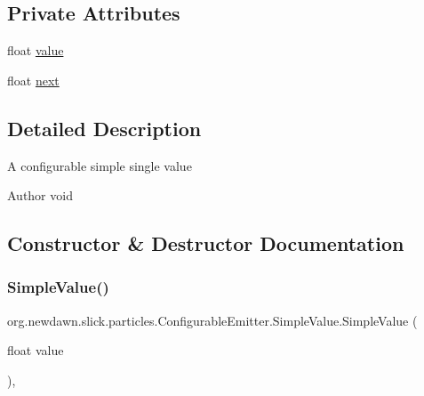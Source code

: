 \subsection*{Private Attributes}
\begin{DoxyCompactItemize}
\item 
float \mbox{\hyperlink{classorg_1_1newdawn_1_1slick_1_1particles_1_1_configurable_emitter_1_1_simple_value_a660ac8ed4db304925cecaf64165c1f3e}{value}}
\item 
float \mbox{\hyperlink{classorg_1_1newdawn_1_1slick_1_1particles_1_1_configurable_emitter_1_1_simple_value_aacb73adb8b1df543d9dbbda8d66db1bf}{next}}
\end{DoxyCompactItemize}


\subsection{Detailed Description}
A configurable simple single value

\begin{DoxyAuthor}{Author}
void 
\end{DoxyAuthor}


\subsection{Constructor \& Destructor Documentation}
\mbox{\label{classorg_1_1newdawn_1_1slick_1_1particles_1_1_configurable_emitter_1_1_simple_value_a9ba58964298d037d732dab840f730013}} 
\subsubsection{\texorpdfstring{Simple\+Value()}{SimpleValue()}}
{\footnotesize\ttfamily org.\+newdawn.\+slick.\+particles.\+Configurable\+Emitter.\+Simple\+Value.\+Simple\+Value (\begin{DoxyParamCaption}\item[{float}]{value }\end{DoxyParamCaption})\hspace{0.3cm}{\ttfamily [inline]}, {\ttfamily [private]}}

